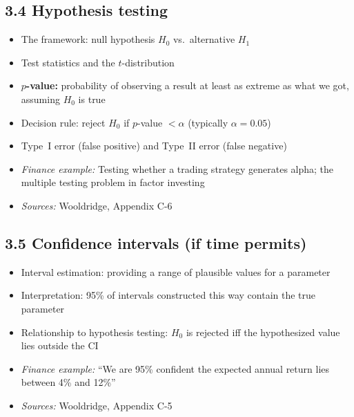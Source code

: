 \documentclass[letterpaper,10pt]{article}
\begin{document}
\subsection*{3.4 Hypothesis testing}
\begin{itemize}
    \item The framework: null hypothesis $H_0$ vs.\ alternative $H_1$
    \item Test statistics and the $t$-distribution
    \item \textbf{$p$-value:} probability of observing a result at least as extreme as what we got, assuming $H_0$ is true
    \item Decision rule: reject $H_0$ if $p$-value $< \alpha$ (typically $\alpha = 0.05$)
    \item Type~I error (false positive) and Type~II error (false negative)
    \item \textit{Finance example:} Testing whether a trading strategy generates alpha; the multiple testing problem in factor investing
    \item \textit{Sources:} Wooldridge, Appendix C-6
\end{itemize}

\subsection*{3.5 Confidence intervals (if time permits)}
\begin{itemize}
    \item Interval estimation: providing a range of plausible values for a parameter
    \item Interpretation: 95\% of intervals constructed this way contain the true parameter
    \item Relationship to hypothesis testing: $H_0$ is rejected iff the hypothesized value lies outside the CI
    \item \textit{Finance example:} ``We are 95\% confident the expected annual return lies between 4\% and 12\%''
    \item \textit{Sources:} Wooldridge, Appendix C-5
\end{itemize}

\end{document}
